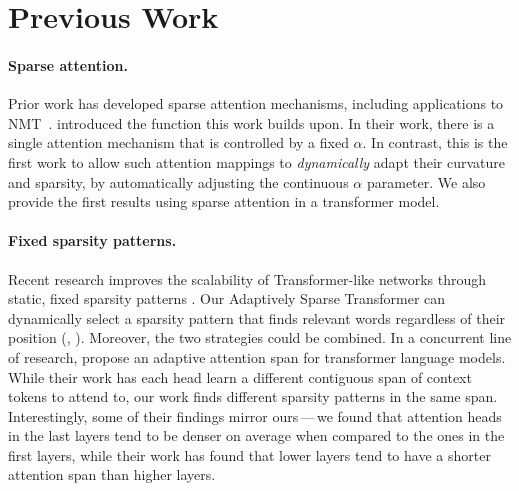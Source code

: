\section{Previous Work}

\paragraph*{Sparse attention.}
Prior work has developed sparse attention mechanisms, including
applications to NMT~\citep{sparsemax, malaviya2018sparse, fusedmax,
    shao2019ssn, maruf2019selective}. \citet{entmax} introduced the
\entmaxtext function this work builds upon. In their work, there is a
single attention mechanism that is controlled by a fixed $\alpha$.
In contrast, this is the first work to allow such attention mappings
to \emph{dynamically} adapt their curvature and sparsity, by
automatically adjusting the continuous $\alpha$ parameter. We also
provide the first results using sparse attention in a transformer
model.

\paragraph*{Fixed sparsity patterns.}
Recent research improves the scalability of Transformer-like networks
through static, fixed sparsity patterns
\citep{openai_sparse_transf,dynamic_conv}. Our Adaptively Sparse
Transformer can dynamically select a sparsity pattern that finds
relevant words regardless of their position (\eg,
). Moreover, the two strategies could be
combined. In a concurrent line of research, \citet{Sukhbaatar2019}
propose an adaptive attention span for transformer language models.
While their work has each head learn a different contiguous span of
context tokens to attend to, our work finds different sparsity
patterns in the same span. Interestingly, some of their findings
mirror ours\,---\,we found that attention heads in the last layers tend
to be denser on average when compared to the ones in the first
layers, while their work has found that lower layers tend to have a
shorter attention span than higher layers.


